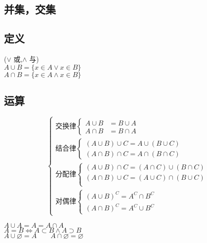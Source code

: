 \begin{center}\section{ 并集，交集}\end{center}
\subsection{定义}
\begin{center}
    (\(\vee\) 或,\(\land\) 与) \\
$A\cup B=\{x\in A\vee x\in B\}$ \\
$A\cap B=\{x\in A\land x\in B\}$
\end{center}
\subsection{运算}
$$\begin{cases}
    \mbox{交换律} \begin{cases}
        A\cup B&= B\cup A  \\
        A\cap B&= B\cap A
    \end{cases} \\
    \mbox{结合律}\begin{cases}
        (A\cup B)\cup C = A\cup(B\cup C) \\
        (A\cap B)\cap C = A\cap(B\cap C)
    \end{cases} \\
    \mbox{分配律}\begin{cases}
        (A\cup B)\cap C = (A\cap C)\cup (B \cap C) \\
        (A\cap B)\cup C = (A\cup C)\cap (B \cup C) \\
    \end{cases}\\
    \mbox{对偶律}\begin{cases}
        (A\cup B)^C = A^C\cap B^C \\
        (A\cap B)^C = A^C\cup B^C
    \end{cases}
\end{cases}$$
\begin{center}
    $A\cup A= A = A\cap A $\\
    $A = B \Leftrightarrow A\subset B\land A\supset B$  \\
    $A\cup\varnothing = A {\qquad}A\cap\varnothing = \varnothing $
\end{center}



